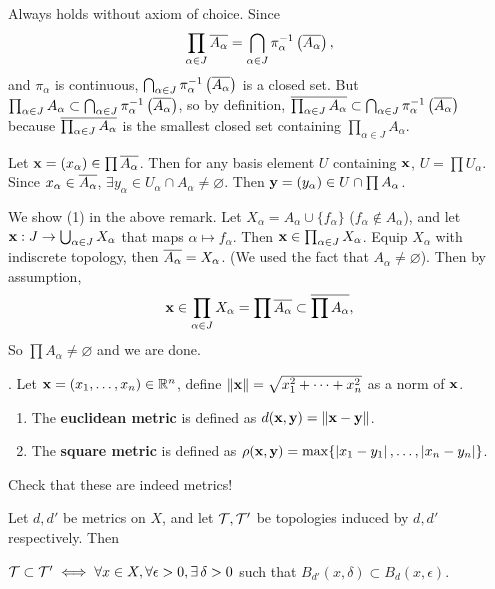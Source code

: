 \pf \note{\(\supset\)} Always holds without axiom of choice. Since
\[
    \prod_{\alpha \in J} \cl{A_\alpha} = \bigcap_{\alpha \in J} \pi_\alpha\inv\paren{\cl{A_\alpha}},
\]
and \(\pi_\alpha\) is continuous, \(\bigcap_{\alpha \in J} \pi_\alpha\inv\paren{\cl{A_\alpha}}\) is a closed set. But \(\prod_{\alpha \in J} A_\alpha \subset \bigcap_{\alpha \in J} \pi_\alpha\inv\paren{\cl{A_\alpha}}\), so by definition, \(\cl{\prod_{\alpha \in J} A_\alpha} \subset \bigcap_{\alpha \in J} \pi_\alpha\inv\paren{\cl{A_\alpha}}\)
because \(\cl{\prod_{\alpha \in J} A_\alpha}\) is the smallest closed set containing \(\prod_{\alpha \in J} A_\alpha\).

 Let \(\bf{x} = (x_\alpha) \in \prod \cl{A_\alpha}\). Then for any basis element \(U\) containing \(\bf{x}\), \(U = \prod U_\alpha\). Since \(x_\alpha \in \cl{A_\alpha}\), \(\exists y_\alpha \in U_\alpha \cap A_\alpha \neq \varnothing\). Then \(\bf{y} = (y_\alpha) \in U \cap \prod A_\alpha\).

 We show (1) in the above remark. Let \(X_\alpha = A_\alpha \cup \{f_\alpha\}\) (\(f_\alpha \notin A_\alpha\)), and let \(\bf{x} : J \ra \bigcup_{\alpha \in J} X_\alpha\) that maps \(\alpha \mapsto f_\alpha\). Then \(\bf{x} \in \prod_{\alpha \in J} X_\alpha\). Equip \(X_\alpha\) with indiscrete topology, then \(\cl{A_\alpha} = X_\alpha\). (We used the fact that \(A_\alpha \neq \varnothing\)). Then by assumption,
\[
    \bf{x} \in \prod_{\alpha \in J} X_\alpha = \prod \cl{A_\alpha} \subset \cl{\prod A_\alpha},
\]
So \(\prod A_\alpha \neq \varnothing\) and we are done.

\vspace*{20px}

. Let \(\bf{x} = (x_1, \dots, x_n) \in \R^n\), define \(\norm{\bf{x}} = \sqrt{x_1^2 + \cdots + x_n^2}\) as a norm of \(\bf{x}\).
\begin{enumerate}
    \item The \textbf{euclidean metric} is defined as \(d(\bf{x}, \bf{y}) = \norm{\bf{x} - \bf{y}}\).
    \item The \textbf{square metric} is defined as \(\rho(\bf{x}, \bf{y}) = \max\{\abs{x_1 - y_1}, \dots, \abs{x_n - y_n}\}\).
\end{enumerate}

Check that these are indeed metrics!

 Let \(d, d'\) be metrics on \(X\), and let \(\mc{T}, \mc{T}'\) be topologies induced by \(d, d'\) respectively. Then
\begin{center}
    \(\mc{T} \subset \mc{T}' \iff \forall x \in X, \forall \epsilon > 0, \exists \delta > 0\) such that \(B_{d'}(x, \delta) \subset B_d(x, \epsilon)\).
\end{center}

